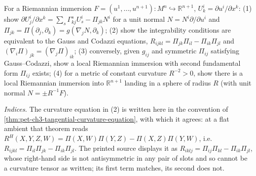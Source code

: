 \begin{remark}
  \label{rem:pet-ch3-ex-21}
  \leanok
  For a Riemannian immersion $F=(u^1,\dots,u^{n+1}):M^n\hookrightarrow\mathbb
  R^{n+1}$, $U^i_k=\partial u^i/\partial x^k$: (1) show
  $\partial U^i_j/\partial x^k=\sum_s\Gamma^s_{kj}U^i_s-\Pi_{jk}N^i$ for a unit normal
  $N=N^i\partial/\partial u^i$ and $\Pi_{jk}=\Pi(\partial_j,\partial_k)=g(\nabla_jN,\partial_k)$;
  (2) show the integrability conditions are equivalent to the Gauss and Codazzi
  equations, $R_{ijkl}=\Pi_{jk}\Pi_{il}-\Pi_{ik}\Pi_{jl}$ and
  $(\nabla_i\Pi)_{jk}=(\nabla_j\Pi)_{ik}$; (3) conversely, given
  $g_{ij}$ and symmetric $\Pi_{ij}$ satisfying Gauss--Codazzi, show a local
  Riemannian immersion with second fundamental form $\Pi_{ij}$ exists; (4) for a
  metric of constant curvature $R^{-2}>0$, show there is a local Riemannian
  immersion into $\mathbb R^{n+1}$ landing in a sphere of radius $R$ (with unit
  normal $N=\pm R^{-1}F$).

  \emph{Indices.} The curvature equation in (2) is written here in the convention
  of \cref{thm:pet-ch3-tangential-curvature-equation}, with which it agrees: at a
  flat ambient that theorem reads $R^H(X,Y,Z,W)=\Pi(X,W)\Pi(Y,Z)-\Pi(X,Z)\Pi(Y,W)$,
  i.e. $R_{ijkl}=\Pi_{il}\Pi_{jk}-\Pi_{ik}\Pi_{jl}$. The printed source displays
  it as $R_{iklj}=\Pi_{ij}\Pi_{kl}-\Pi_{ik}\Pi_{jl}$, whose right-hand side is not
  antisymmetric in any pair of slots and so cannot be a curvature tensor as
  written; its first term matches, its second does not.
\end{remark}

